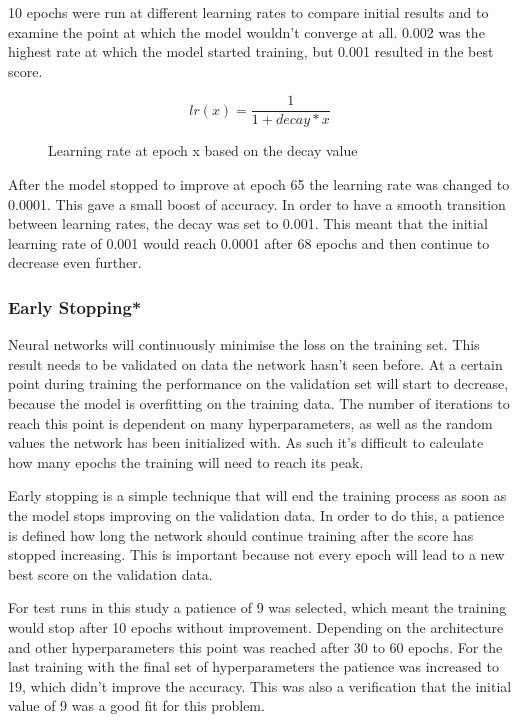 10 epochs were run at different learning rates to compare initial results and to examine the point at which the model wouldn't converge at all. 0.002 was the highest rate at which the model started training, but 0.001 resulted in the best score.

\begin{figure}[H]
\[
lr(x) = \frac{1}{1 + decay * x}
\]
\caption{Learning rate at epoch x based on the decay value}
\end{figure}

After the model stopped to improve at epoch 65 the learning rate was changed to 0.0001. This gave a small boost of accuracy. In order to have a smooth transition between learning rates, the decay was set to 0.001. This meant that the initial learning rate of 0.001 would reach 0.0001 after 68 epochs and then continue to decrease even further.

\subsubsection{Early Stopping*}

Neural networks will continuously minimise the loss on the training set. This result needs to be validated on data the network hasn't seen before. At a certain point during training the performance on the validation set will start to decrease, because the model is overfitting on the training data. The number of iterations to reach this point is dependent on many hyperparameters, as well as the random values the network has been initialized with. As such it's difficult to calculate how many epochs the training will need to reach its peak.

Early stopping is a simple technique that will end the training process as soon as the model stops improving on the validation data. In order to do this, a patience is defined how long the network should continue training after the score has stopped increasing. This is important because not every epoch will lead to a new best score on the validation data.

For test runs in this study a patience of 9 was selected, which meant the training would stop after 10 epochs without improvement. Depending on the architecture and other hyperparameters this point was reached after 30 to 60 epochs. For the last training with the final set of hyperparameters the patience was increased to 19, which didn't improve the accuracy.  This was also a verification that the initial value of 9 was a good fit for this problem.

\newpage
